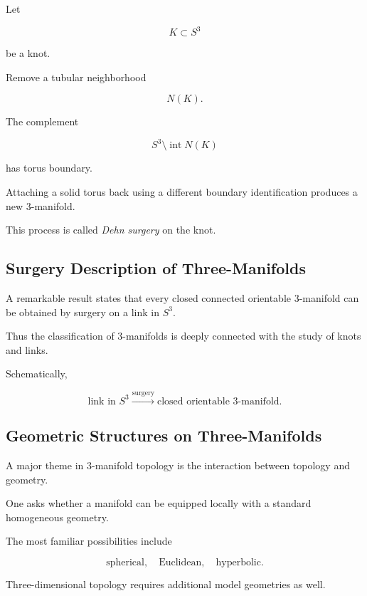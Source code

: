 Let

\[
K\subset S^3
\]

be a knot.

Remove a tubular neighborhood

\[
N(K).
\]

The complement

\[
\boxed{
S^3\setminus\operatorname{int}N(K)
}
\]

has torus boundary.

Attaching a solid torus back using a different boundary identification
produces a new \(3\)-manifold.

This process is called \emph{Dehn surgery} on the knot.

\subsection{Surgery Description of Three-Manifolds}
\label{subsec:surgery-description-three-manifolds}

A remarkable result states that every closed connected orientable
\(3\)-manifold can be obtained by surgery on a link in \(S^3\).

Thus the classification of \(3\)-manifolds is deeply connected with the
study of knots and links.

Schematically,

\[
\boxed{
\text{link in }S^3
\overset{\text{surgery}}{\longrightarrow}
\text{closed orientable }3\text{-manifold}.
}
\]

\subsection{Geometric Structures on Three-Manifolds}
\label{subsec:geometric-structures-three-manifolds}

A major theme in \(3\)-manifold topology is the interaction between topology
and geometry.

One asks whether a manifold can be equipped locally with a standard
homogeneous geometry.

The most familiar possibilities include

\[
\boxed{
\text{spherical},
\quad
\text{Euclidean},
\quad
\text{hyperbolic}.
}
\]

Three-dimensional topology requires additional model geometries as well.

